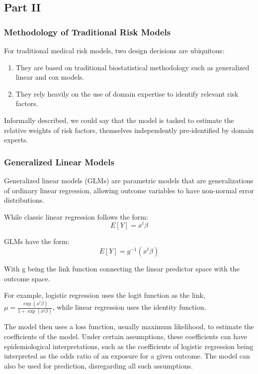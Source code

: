 \documentclass[a4paper,12pt]{article}
\begin{document}
		\subsection{Part II}
		
			\subsubsection{Methodology of Traditional Risk Models}
		
			For traditional medical risk models, two design decisions are ubiquitous\cite{Weng2017}:
			\begin{enumerate}
				\item They are based on traditional biostatistical methodology such as generalized linear and cox models.
				\item They rely heavily on the use of domain expertise to identify relevant risk factors.
			\end{enumerate}
		
			Informally described, we could say that the model is tasked to estimate the relative weights of risk factors, themselves independently pre-identified by domain experts.
		
			\subsubsection{Generalized Linear Models}
			
			Generalized linear models (GLMs) are parametric models that are generalizations of ordinary linear regression, allowing outcome variables to have non-normal error distributions\cite{Nelder1972}.
			
			While classic linear regression follows the form:
			\begin{equation*}
			E[Y] = x^t \beta
			\end{equation*}
			
			GLMs have the form:
			\begin{equation*}
			E[Y] = g^{-1} (x^t \beta)
			\end{equation*}
			
			With g being the link function connecting the linear predictor space with the outcome space.
			
			For example, logistic regression uses the logit function as the link, $ \mu = \frac{\exp (x^t \beta)}{1 + \exp (x^t \beta)} $, while linear regression uses the identity function.
			
			The model then uses a loss function, usually maximum likelihood, to estimate the coefficients of the model. Under certain assumptions, these coefficients can have epidemiological interpretations, such as the coefficients of logistic regression being interpreted as the odds ratio of an exposure for a given outcome. The model can also be used for prediction, disregarding all such assumptions.
			
\end{document}
